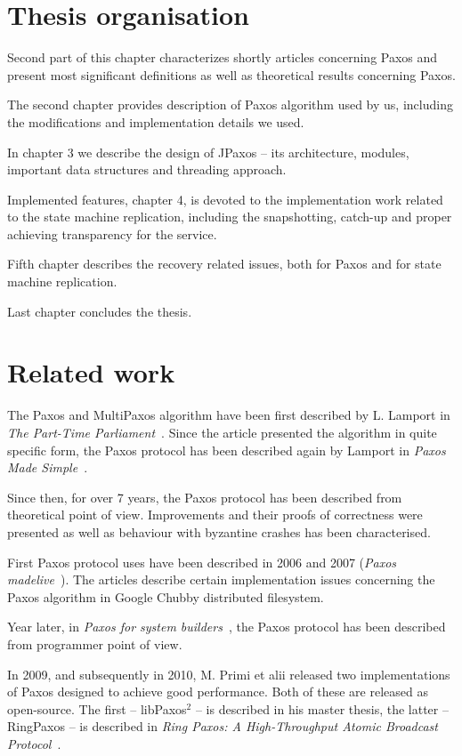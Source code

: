 \section{Thesis organisation}
Second part of this chapter characterizes shortly articles concerning Paxos and present most significant definitions as well as theoretical results concerning Paxos.

The second chapter provides description of Paxos algorithm used by us, including the modifications and implementation details we used.

In chapter 3 we describe the design of JPaxos -- its architecture, modules, important data structures and threading approach.

Implemented features, chapter 4, is devoted to the implementation work related to the state machine replication, including the snapshotting, catch-up and proper achieving transparency for the service.

Fifth chapter describes the recovery related issues, both for Paxos and for state machine replication.

Last chapter concludes the thesis. %

\section{Related work}

The Paxos and MultiPaxos algorithm have been first described by L. Lamport in \textit{The Part-Time Parliament}~\cite{Lam98}. Since the article presented the algorithm in quite specific form, the Paxos protocol has been described again by Lamport in \textit{Paxos Made Simple}~\cite{Lam01}.

Since then, for over 7 years, the Paxos protocol has been described from theoretical point of view. Improvements and their proofs of correctness were presented as well as behaviour with byzantine crashes has been characterised.

First Paxos protocol uses have been described in 2006 and 2007 (\textit{Paxos made\linebreak live}~\cite{CGR07}). The articles describe certain implementation issues concerning the Paxos algorithm in Google Chubby distributed filesystem.

Year later, in \textit{Paxos for system builders}~\cite{AK08}, the Paxos protocol has been described from programmer point of view.

In 2009, and subsequently in 2010, M. Primi et alii released two implementations of Paxos designed to achieve good performance. Both of these are released as open-source. The first -- libPaxos$^2$ -- is described in his master thesis, the latter -- RingPaxos -- is described in \textit{Ring Paxos: A High-Throughput Atomic Broadcast Protocol}~\cite{Mar10}.

